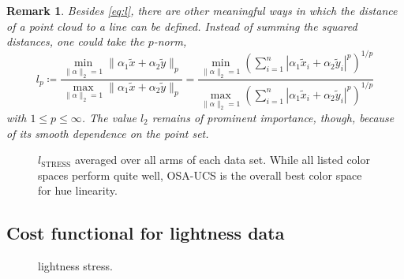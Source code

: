 \documentclass{scrartcl}
\newtheorem*{remark}{Remark}
\theoremstyle{named}
\begin{document}
\begin{remark}
Besides \eqref{eq:l}, there are other meaningful ways in which the distance of a point
cloud to a line can be defined. Instead of summing the squared distances, one could take
the $p$-norm,
\[
l_p
  \coloneqq
  \frac{
    \min_{\|\alpha\|_2=1} \|\alpha_1 \tilde{x} + \alpha_2\tilde{y}\|_p
  }{
    \max_{\|\alpha\|_2=1} \|\alpha_1 \tilde{x} + \alpha_2\tilde{y}\|_p
  }
  = \frac{
    \min_{\|\alpha\|_2=1}
  \left(\sum_{i=1}^n |\alpha_1 \tilde{x}_i + \alpha_2 \tilde{y}_i|^p\right)^{1/p}
}{
    \max_{\|\alpha\|_2=1}
  \left(\sum_{i=1}^n |\alpha_1 \tilde{x}_i + \alpha_2 \tilde{y}_i|^p\right)^{1/p}
}
\]
  with $1\le p \le \infty$.
  The value $l_2$ remains of prominent importance, though, because of its smooth
  dependence on the point set.
\end{remark}


\begin{figure}
  \centering
  
  \caption{$l_\text{STRESS}$ averaged over all arms of each data set.  While all listed
  color spaces perform quite well, OSA-UCS is the overall best color space for hue
  linearity.}
\end{figure}

\subsection{Cost functional for lightness data}

\cite{fairchildchen}

\begin{figure}
  \centering
  
  \caption{lightness stress.}
\end{figure}


{}

\end{document}
